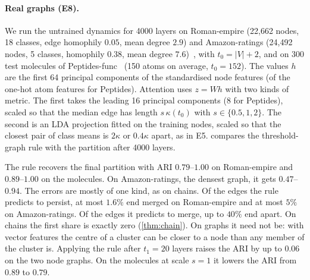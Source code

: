 \documentclass[10pt]{article}
\theoremstyle{definition}
\theoremstyle{remark}
\begin{document}
\begin{table}[!t]
\centering\footnotesize\setlength{\tabcolsep}{4pt}

\caption{\textbf{Predicting clusters on real graphs} (E8, untrained dynamics, 4000 layers). \emph{Clusters}: final partition;
\emph{predicted}: threshold-graph rule at $t_1=0$. \emph{ARI}: between the rule applied after $t_1$ layers and the final partition.
\emph{False persist}: share of the edges predicted to persist (endpoints in different
predicted clusters) whose endpoints end in one cluster. \emph{False merge}: share of the edges predicted to merge whose endpoints end apart.
Peptides-func: means over 300 test molecules.}
\label{tab:predict-real}
\end{table}

\paragraph{Real graphs (E8).} We run the untrained dynamics for 4000 layers on Roman-empire (22,662 nodes, 18 classes, edge homophily
$0.05$, mean degree $2.9$) and Amazon-ratings (24,492 nodes, 5 classes, homophily $0.38$, mean degree $7.6$)~\citep{platonov2023}, with
$t_0=|V|+2$, and on 300 test molecules of Peptides-func~\citep{dwivedi2022} (150 atoms on average, $t_0=152$). The values $h$ are the first
64 principal components of the standardised node features (of the one-hot atom features for Peptides). Attention uses $z=Wh$ with two kinds
of metric. The first takes the leading 16 principal components (8 for Peptides), scaled so that the median edge has length $s\,\kappa(t_0)$
with $s\in\{0.5,1,2\}$. The second is an LDA projection fitted on the training nodes, scaled so that the closest pair of class means is
$2\kappa$ or $0.4\kappa$ apart, as in E5.  compares the threshold-graph rule with the partition after 4000 layers.

The rule recovers the final partition with ARI $0.79$--$1.00$ on Roman-empire and $0.89$--$1.00$ on the molecules. On Amazon-ratings, the
densest graph, it gets $0.47$--$0.94$. The errors are mostly of one kind, as on chains. Of the edges the rule predicts to persist, at most
$1.6\%$ end merged on Roman-empire and at most $5\%$ on Amazon-ratings. Of the edges it predicts to merge, up to $40\%$ end apart. On chains
the first share is exactly zero (\cref{thm:chain}). On graphs it need not be: with vector features the centre of a cluster can be closer to
a node than any member of the cluster is. Applying the rule after $t_1=20$ layers raises the ARI by up to $0.06$ on the two node graphs.
On the molecules at scale $s=1$ it lowers the ARI from $0.89$ to $0.79$.
\end{document}
